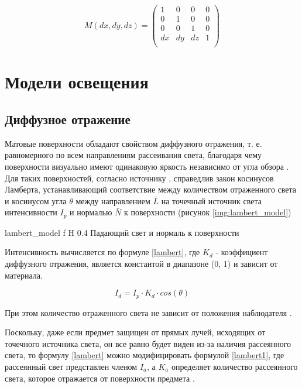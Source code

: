 \begin{equation}
	\label{Mmove}
	M(dx, dy, dz) = 
	\begin{pmatrix}
		1 & 0 & 0 & 0 \\
		0 & 1 & 0 & 0 \\
		0 & 0 & 1 & 0 \\
		dx & dy & dz & 1 \\ 
	\end{pmatrix}
\end{equation}

\section{Модели освещения}

\subsection{Диффузное отражение}

Матовые поверхности обладают свойством диффузного отражения, т. е. равномерного по всем направлениям рассеивания света, благодаря чему поверхности визуально имеют одинаковую яркость независимо от угла обзора \cite{kgtomsk}. 
Для таких поверхностей, согласно источнику \cite{kgtomsk}, справедлив закон косинусов Ламберта, устанавливающий соответствие между количеством отраженного света и косинусом угла $\theta$ между направлением $\bar{L}$  на точечный источник света интенсивности $I_p$ и нормалью $\bar{N}$ к поверхности (рисунок \ref{img:lambert_model})

{lambert_model}
{f}
{H}
{0.4\textwidth}
{Падающий свет и нормаль к поверхности}

Интенсивность вычисляется по формуле \ref{lambert}, где $K_d$ - коэффициент диффузного отражения, является константой в диапазоне (0, 1) и зависит от материала.

\begin{equation}
	\label{lambert}
	I_d = I_p \cdot K_d \cdot cos(\theta)
\end{equation}

При этом количество отраженного света не зависит от положения наблюдателя \cite{kgtomsk}.

Поскольку, даже если предмет защищен от прямых лучей, исходящих от точечного источника света, он все равно будет виден из-за наличия рассеянного света, то формулу \ref{lambert} можно модифицировать формулой \ref{lambert1}, где рассеянный свет представлен членом $I_a$, а $K_a$ определяет количество рассеянного света, которое отражается от поверхности предмета \cite{kgtomsk}. 

